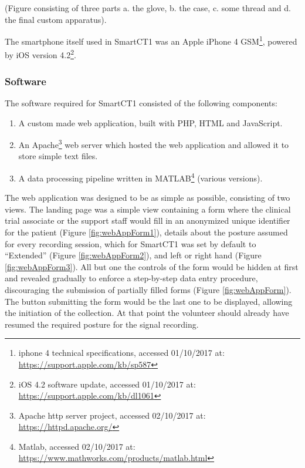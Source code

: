 (\textcolor{BurntOrange}{Figure consisting of three parts a. the glove, b. the case, c. some thread and d. the final custom apparatus}).

The smartphone itself used in \gls{SmartCT1} was an Apple iPhone 4 GSM\footnote{iphone 4 technical specifications, accessed 01/10/2017 at: \url{https://support.apple.com/kb/sp587}}, powered by iOS version 4.2\footnote{iOS 4.2 software update, accessed 01/10/2017 at: \url{https://support.apple.com/kb/dl1061}}. 


\subsubsection{Software}
\label{subsubsec:smartCT1Software}
The software required for \gls{SmartCT1} consisted of the following components:

\begin{enumerate}
\item A custom made web application, built with PHP, HTML and JavaScript.
\item An Apache\footnote{Apache http server project, accessed 02/10/2017 at: \url{https://httpd.apache.org/}} web server which hosted the web application and allowed it to store simple text files.
\item A data processing pipeline written in MATLAB\footnote{Matlab, accessed 02/10/2017 at: \url{https://www.mathworks.com/products/matlab.html}} (various versions).
\end{enumerate}

The web application was designed to be as simple as possible, consisting of two views. The landing page was a simple view containing a form where the clinical trial associate or the support staff would fill in an anonymized unique identifier for the patient (Figure \ref{fig:webAppForm1}), details about the posture assumed for every recording session, which for \gls{SmartCT1} was set by default to ``Extended'' (Figure \ref{fig:webAppForm2}), and left or right hand (Figure \ref{fig:webAppForm3}). All but one the controls of the form would be hidden at first and revealed gradually to enforce a step-by-step data entry procedure, discouraging the submission of partially filled forms (Figure \ref{fig:webAppForm}). The button submitting the form would be the last one to be displayed, allowing the initiation of the collection. At that point the volunteer should already have resumed the required posture for the signal recording. 

